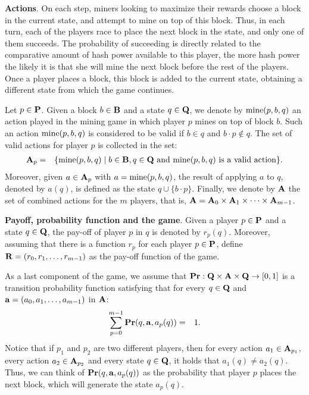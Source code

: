 \medskip
\noindent
\textbf{Actions}.
On each step, miners looking to maximize their rewards choose a block in the current state, and attempt to mine on top of this block. Thus, in each turn, each of the players race to place the next block in the state, and only one of them succeeds. The probability of succeeding is directly related to the comparative amount of hash power available to this player, the more hash power the likely it is that she will mine the next block before the rest of the players. Once a player places a block, this block is added to the current state, obtaining a different state from which the game continues.

Let $p \in \mathbf{P}$. Given a block $b \in \mathbf{B}$ and a state $q \in \mathbf{Q}$, we denote by $\text{\rm mine}(p,b,q)$ an action played in the mining game in which player $p$ mines on top of block $b$. Such an action $\text{\rm mine}(p,b,q)$ is considered to be valid if $b \in q$ and $b\cdot p \not\in q$. The set of valid actions for player $p$ is collected in the set:
\begin{eqnarray*}
\mathbf{A}_p & = & \{ \text{\rm mine}(p,b,q) \mid b \in \mathbf{B}, q \in \mathbf{Q} \text{ and }\text{\rm mine}(p,b,q) \text{ is a valid action}\}.
\end{eqnarray*}
Moreover, given $a \in \mathbf{A}_p$ with $a = \text{\rm mine}(p,b,q)$, the result of applying $a$ to $q$, denoted by $a(q)$, is defined as the state $q \cup \{b \cdot p\}$. Finally, we denote by $\mathbf{A}$ the set of combined actions for the $m$ players, that is, $\mathbf{A} = \mathbf{A}_0 \times \mathbf{A}_1 \times \cdots \times \mathbf{A}_{m-1}$.

\medskip
\noindent
\textbf{Payoff, probability function and the game}.
Given a player $p \in \mathbf{P}$ and a state $q \in \mathbf{Q}$, the pay-off of player $p$ in $q$ is denoted by $r_p(q)$. Moreover, assuming that there is a  function $r_p$ for each player $p \in \mathbf{P}$, define $\mathbf{R} = (r_0, r_1, \ldots, r_{m-1})$ as the pay-off function of the game.

As a last component of the game, we assume that $\mathbf{Pr} : \mathbf{Q} \times \mathbf{A} \times \mathbf{Q} \to [0,1]$ is a transition probability function satisfying that for every $q \in \mathbf{Q}$ and $\mathbf{a} = (a_0, a_1, \ldots, a_{m-1})$ in $\mathbf{A}$:
\begin{eqnarray*}\label{eq-prop}
\sum_{p=0}^{m-1} \mathbf{Pr}(q, \mathbf{a}, a_p(q)) & = & 1.
\end{eqnarray*}
Notice that if $p_1$ and $p_2$ are two different players, then for every action $a_1 \in \mathbf{A}_{p_1}$, every action $a_2 \in \mathbf{A}_{p_2}$ and every state $q \in \mathbf{Q}$, it holds that $a_1(q) \neq a_2(q)$. Thus, we can think of $\mathbf{Pr}(q, \mathbf{a}, a_p(q))$ as the probability that player $p$ places the next block, which will generate the state $a_p(q)$. 

